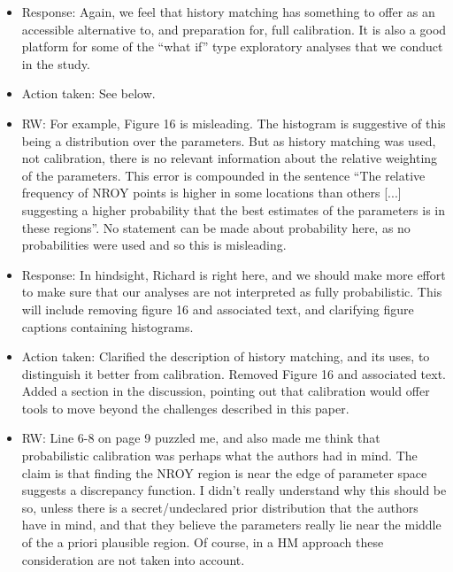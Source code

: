 \documentclass[esd, manuscript]{copernicus}
\begin{document}
\begin{itemize}
\item{Response: Again, we feel that history matching has something to offer as an accessible alternative to, and preparation for, full calibration. It is also a good platform for some of the ``what if'' type exploratory analyses that we conduct in the study.}

\item{Action taken: See below.}

\item{RW: For example, Figure 16 is misleading. The histogram is suggestive of this being a distribution over the parameters. But as history matching was used, not calibration, there is no relevant information about the relative weighting of the parameters. This error is compounded in the sentence ``The relative frequency of NROY points is higher in some locations than others [...] suggesting a higher probability that the best estimates of the parameters is in these regions''. No statement can be made about probability here, as no probabilities were used and so this is misleading.}

\item{Response: In hindsight, Richard is right here, and we should make more effort to make sure that our analyses are not interpreted as fully probabilistic. This will include removing figure 16 and associated text, and clarifying figure captions containing histograms.}

\item{Action taken: Clarified the description of history matching, and its uses, to distinguish it better from calibration. Removed Figure 16 and associated text. Added a section in the discussion, pointing out that calibration would offer tools to move beyond the challenges described in this paper.}

\item{RW: Line 6-8 on page 9 puzzled me, and also made me think that probabilistic calibration was perhaps what the authors had in mind. The claim is that finding the NROY region is near the edge of parameter space suggests a discrepancy function. I didn't really understand why this should be so, unless there is a secret/undeclared prior distribution that the authors have in mind, and that they believe the parameters really lie near the middle of the a priori plausible region. Of course, in a HM approach these consideration are not taken into account.}


\end{itemize}
\end{document}
